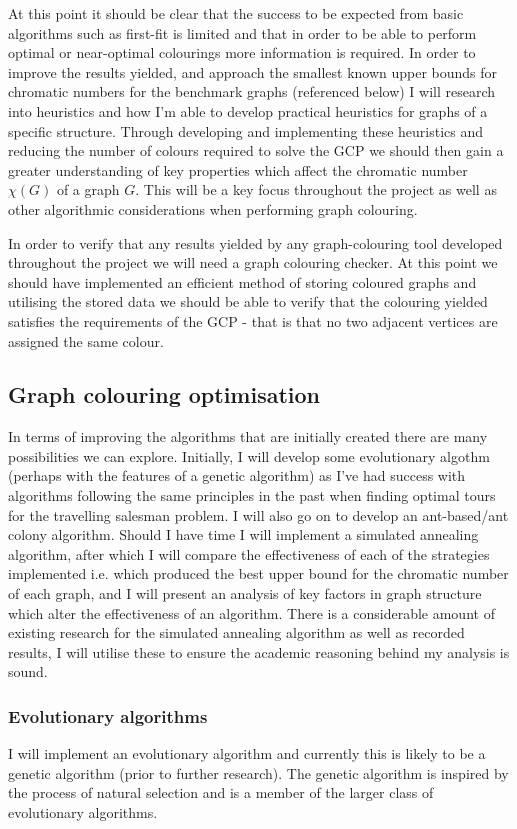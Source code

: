 \documentclass[12pt, a4paper]{article}
\begin{document}
{At this point it should be clear that the success to be expected from basic algorithms such as first-fit is limited and that in order to be able to perform optimal or near-optimal colourings more information is required. In order to improve the results yielded, and approach the smallest known upper bounds for chromatic numbers for the benchmark graphs (referenced below) I will research into heuristics and how I'm able to develop practical heuristics for graphs of a specific structure. Through developing and implementing these heuristics and reducing the number of colours required to solve the GCP we should then gain a greater understanding of key properties which affect the chromatic number $\chi(G)$ of a graph $G$. This will be a key focus throughout the project as well as other algorithmic considerations when performing graph colouring. \par
In order to verify that any results yielded by any graph-colouring tool developed throughout the project we will need a graph colouring checker. At this point we should have implemented an efficient method of storing coloured graphs and utilising the stored data we should be able to verify that the colouring yielded satisfies the requirements of the GCP - that is that no two adjacent vertices are assigned the same colour.
\subsection*{Graph colouring optimisation}
\hspace{\parindent} In terms of improving the algorithms that are initially created there are many possibilities we can explore. Initially, I will develop some evolutionary algothm (perhaps with the features of a genetic algorithm) as I've had success with algorithms following the same principles in the past when finding optimal tours for the travelling salesman problem. I will also go on to develop an ant-based/ant colony algorithm. Should I have time I will implement a simulated annealing algorithm, after which I will compare the effectiveness of each of the strategies implemented i.e. which produced the best upper bound for the chromatic number of each graph, and I will present an analysis of key factors in graph structure which alter the effectiveness of an algorithm. There is a considerable amount of existing research for the simulated annealing algorithm as well as recorded results, I will utilise these to ensure the academic reasoning behind my analysis is sound.
\subsubsection*{Evolutionary algorithms}
\hspace{\parindent}I will implement an evolutionary algorithm and currently this is likely to be a genetic algorithm (prior to further research). The genetic algorithm is inspired by the process of natural selection and is a member of the larger class of evolutionary algorithms. 
}
\end{document}
